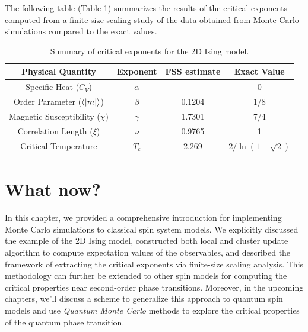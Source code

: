 \documentclass[../thesis_main.tex]{subfiles}
\begin{document}
\FloatBarrier \!\!\!\!\!\!\!\!\!\!\!
The following table (Table \ref{critical}) summarizes the results of the critical exponents computed from a finite-size scaling study of the data obtained from Monte Carlo simulations compared to the exact values.
\begin{table}[h!]
    \begin{center}
    \begin{tabular}{||c c c c||}
    \hline
    Physical Quantity & Exponent & FSS estimate  & Exact Value \\ \hline\hline
    Specific Heat ($C_V$) & $\alpha$ & \textbf{--} & 0 \\ \hline
    Order Parameter ($\expval{|m|}$) & $\beta$ & 0.1204 & 1/8 \\ \hline
    Magnetic Susceptibility ($\chi$) & $\gamma$ & 1.7301 & 7/4 \\ \hline
    Correlation Length ($\xi$) & $\nu$ & 0.9765 & 1 \\ \hline
    Critical Temperature & $T_c$ & 2.269  & $2/\ln(1+\sqrt{2})$ \\
    \hline
    \end{tabular}
    \caption{Summary of critical exponents for the 2D Ising model.}
    \label{critical}
    \end{center}   
\end{table}
\section{What now?}
In this chapter, we provided a comprehensive introduction for implementing Monte Carlo simulations to classical spin system models. We explicitly discussed the example of the 2D Ising model, constructed both local and cluster update algorithm to compute expectation values of the observables, and described the framework of extracting the critical exponents via finite-size scaling analysis. This methodology can further be extended to other spin models for computing the critical properties near second-order phase transitions. Moreover, in the upcoming chapters, we'll discuss a scheme to generalize this approach to quantum spin models and use \textit{Quantum Monte Carlo} methods to explore the critical properties of the quantum phase transition. 
\end{document}
